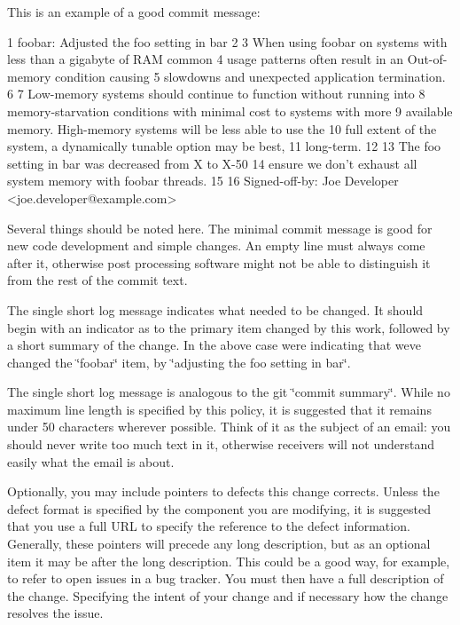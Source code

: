This is an example of a good commit message\+:


\begin{DoxyCode}
1 foobar: Adjusted the foo setting in bar
2 
3 When using foobar on systems with less than a gigabyte of RAM common
4 usage patterns often result in an Out-of-memory condition causing
5 slowdowns and unexpected application termination.
6 
7 Low-memory systems should continue to function without running into
8 memory-starvation conditions with minimal cost to systems with more
9 available memory.  High-memory systems will be less able to use the
10 full extent of the system, a dynamically tunable option may be best,
11 long-term.
12 
13 The foo setting in bar was decreased from X to X-50%
14 ensure we don't exhaust all system memory with foobar threads.
15 
16 Signed-off-by: Joe Developer <joe.developer@example.com>
\end{DoxyCode}


Several things should be noted here. The minimal commit message is good for new code development and simple changes. An empty line must always come after it, otherwise post processing software might not be able to distinguish it from the rest of the commit text.

The single short log message indicates what needed to be changed. It should begin with an indicator as to the primary item changed by this work, followed by a short summary of the change. In the above case we\textquotesingle{}re indicating that we\textquotesingle{}ve changed the \char`\"{}foobar\char`\"{} item, by \char`\"{}adjusting the foo setting in bar\char`\"{}.

The single short log message is analogous to the git \char`\"{}commit summary\char`\"{}. While no maximum line length is specified by this policy, it is suggested that it remains under 50 characters wherever possible. Think of it as the subject of an email\+: you should never write too much text in it, otherwise receivers will not understand easily what the email is about.

Optionally, you may include pointers to defects this change corrects. Unless the defect format is specified by the component you are modifying, it is suggested that you use a full U\+RL to specify the reference to the defect information. Generally, these pointers will precede any long description, but as an optional item it may be after the long description. This could be a good way, for example, to refer to open issues in a bug tracker. You must then have a full description of the change. Specifying the intent of your change and if necessary how the change resolves the issue.

